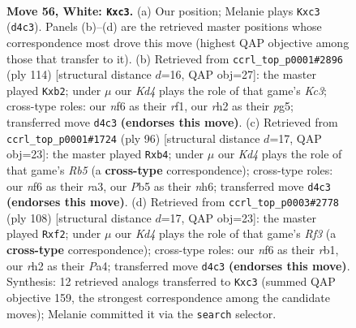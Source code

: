 \documentclass[11pt]{article}
\begin{document}
\clearpage

\begin{figure}[p]\centering
\begin{subfigure}{0.46\textwidth}\centering
\resizebox{\linewidth}{!}{%
\newchessgame
\chessboard[
  setfen={8/R7/5nk1/1P6/P2K2P1/2p5/7r/8 w - - 0 56},
  showmover=false,
  pgfstyle=straightmove, color=movearrow, markmove={d4-c3}
]}
\caption{}
\end{subfigure}\hfill
\begin{subfigure}{0.46\textwidth}\centering
\resizebox{\linewidth}{!}{%
\newchessgame
\chessboard[
  setfen={8/6k1/8/6p1/4P3/2K2P1R/1p6/5r2 w - - 2 58},
  showmover=false,
  pgfstyle=straightmove, color=movearrow, markmove={c3-b2}
]}
\caption{}
\end{subfigure}
\\[4pt]
\begin{subfigure}{0.46\textwidth}\centering
\resizebox{\linewidth}{!}{%
\newchessgame
\chessboard[
  setfen={8/8/6kn/1R6/Pp1KP3/r7/8/8 w - - 4 49},
  showmover=false,
  pgfstyle=straightmove, color=movearrow, markmove={b5-b4}
]}
\caption{}
\end{subfigure}\hfill
\begin{subfigure}{0.46\textwidth}\centering
\resizebox{\linewidth}{!}{%
\newchessgame
\chessboard[
  setfen={8/1kp5/8/1P6/P7/1P1K1R2/5p2/1r6 w - - 2 55},
  showmover=false,
  pgfstyle=straightmove, color=movearrow, markmove={f3-f2}
]}
\caption{}
\end{subfigure}
\caption{\textbf{Move 56, White: \texttt{Kxc3}.} (a) Our position; Melanie plays \texttt{Kxc3} (\texttt{d4c3}). Panels (b)--(d) are the retrieved master positions whose correspondence most drove this move (highest QAP objective among those that transfer to it). (b) Retrieved from \texttt{ccrl\_top\_p0001\#2896} (ply 114) [structural distance $d$=16, QAP obj=27]: the master played \texttt{Kxb2}; under $\mu$ our \emph{Kd4} plays the role of that game's \emph{Kc3}; cross-type roles: our \emph{n}f6 as their \emph{r}f1, our \emph{r}h2 as their \emph{p}g5; transferred move \texttt{d4c3} \textbf{(endorses this move)}. (c) Retrieved from \texttt{ccrl\_top\_p0001\#1724} (ply 96) [structural distance $d$=17, QAP obj=23]: the master played \texttt{Rxb4}; under $\mu$ our \emph{Kd4} plays the role of that game's \emph{Rb5} (a \textbf{cross-type} correspondence); cross-type roles: our \emph{n}f6 as their \emph{r}a3, our \emph{P}b5 as their \emph{n}h6; transferred move \texttt{d4c3} \textbf{(endorses this move)}. (d) Retrieved from \texttt{ccrl\_top\_p0003\#2778} (ply 108) [structural distance $d$=17, QAP obj=23]: the master played \texttt{Rxf2}; under $\mu$ our \emph{Kd4} plays the role of that game's \emph{Rf3} (a \textbf{cross-type} correspondence); cross-type roles: our \emph{n}f6 as their \emph{r}b1, our \emph{r}h2 as their \emph{P}a4; transferred move \texttt{d4c3} \textbf{(endorses this move)}. Synthesis: 12 retrieved analogs transferred to \texttt{Kxc3} (summed QAP objective 159, the strongest correspondence among the candidate moves); Melanie committed it via the \texttt{search} selector.}
\label{fig:thought-m110}
\end{figure}
\end{document}
